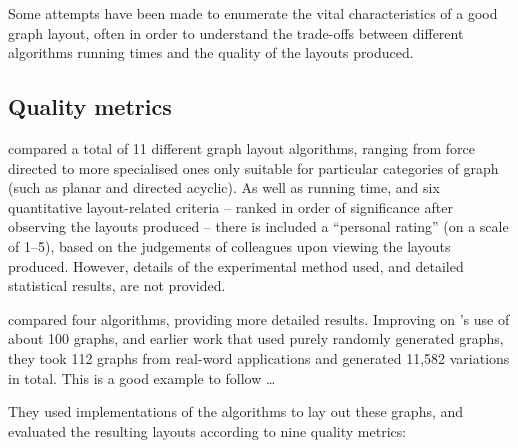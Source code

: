 \begin{itemize*}
Some attempts have been made to enumerate the vital characteristics of a good graph layout, often in order to understand the trade-offs between different algorithms running times and the quality of the layouts produced.


\subsection{Quality metrics}

\citet{Himsolt95comparingand} compared a total of 11 different graph layout algorithms, ranging from force directed to more specialised ones only suitable for particular categories of graph (such as planar and directed acyclic).
As well as running time, and six quantitative layout-related criteria -- ranked in order of significance after observing the layouts produced -- there is included a ``personal rating'' (on a scale of 1--5), based on the judgements of colleagues upon viewing the layouts produced.
However, details of the experimental method used, and detailed statistical results, are not provided.

\citet{DiBattista1997303} compared four algorithms, providing more detailed results.
Improving on \citeauthor{Himsolt95comparingand}'s use of about 100 graphs, and earlier work  that used purely randomly generated graphs, they took 112 graphs from real-word applications and generated 11,582 variations in total. This is a good example to follow \ldots

They used implementations of the algorithms to lay out these graphs, and evaluated the resulting layouts according to nine quality metrics:


\end{itemize*}
